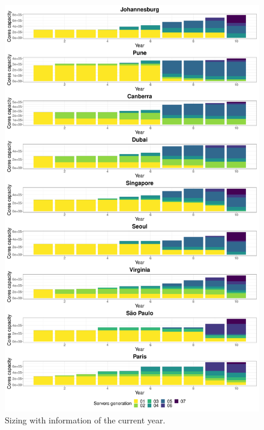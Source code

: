\begin{figure}

\centering
  
  \includegraphics[width=\linewidth]{images/dc_evolution_year_by_year.pdf}
  \caption{Sizing with information of the current year.}
  \label{fig:dc_evolution_year_by_year}
\end{figure}

